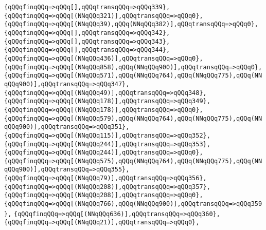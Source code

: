 \verb|{qQQqfinqQQq=>qQQq[],qQQqtransqQQq=>qQQq339},|\newline
\verb|{qQQqfinqQQq=>qQQq[(NNqQQq321)],qQQqtransqQQq=>qQQq0},|\newline
\verb|{qQQqfinqQQq=>qQQq[(NNqQQq39),qQQq(NNqQQq382)],qQQqtransqQQq=>qQQq0},|\newline
\verb|{qQQqfinqQQq=>qQQq[],qQQqtransqQQq=>qQQq342},|\newline
\verb|{qQQqfinqQQq=>qQQq[],qQQqtransqQQq=>qQQq343},|\newline
\verb|{qQQqfinqQQq=>qQQq[],qQQqtransqQQq=>qQQq344},|\newline
\verb|{qQQqfinqQQq=>qQQq[(NNqQQq436)],qQQqtransqQQq=>qQQq0},|\newline
\verb|{qQQqfinqQQq=>qQQq[(NNqQQq858),qQQq(NNqQQq900)],qQQqtransqQQq=>qQQq0},|\newline
\verb|{qQQqfinqQQq=>qQQq[(NNqQQq571),qQQq(NNqQQq764),qQQq(NNqQQq775),qQQq(NNqQQq900)],qQQqtransqQQq=>qQQq347},|\newline
\verb|{qQQqfinqQQq=>qQQq[(NNqQQq49)],qQQqtransqQQq=>qQQq348},|\newline
\verb|{qQQqfinqQQq=>qQQq[(NNqQQq178)],qQQqtransqQQq=>qQQq349},|\newline
\verb|{qQQqfinqQQq=>qQQq[(NNqQQq178)],qQQqtransqQQq=>qQQq0},|\newline
\verb|{qQQqfinqQQq=>qQQq[(NNqQQq579),qQQq(NNqQQq764),qQQq(NNqQQq775),qQQq(NNqQQq900)],qQQqtransqQQq=>qQQq351},|\newline
\verb|{qQQqfinqQQq=>qQQq[(NNqQQq115)],qQQqtransqQQq=>qQQq352},|\newline
\verb|{qQQqfinqQQq=>qQQq[(NNqQQq244)],qQQqtransqQQq=>qQQq353},|\newline
\verb|{qQQqfinqQQq=>qQQq[(NNqQQq244)],qQQqtransqQQq=>qQQq0},|\newline
\verb|{qQQqfinqQQq=>qQQq[(NNqQQq575),qQQq(NNqQQq764),qQQq(NNqQQq775),qQQq(NNqQQq900)],qQQqtransqQQq=>qQQq355},|\newline
\verb|{qQQqfinqQQq=>qQQq[(NNqQQq79)],qQQqtransqQQq=>qQQq356},|\newline
\verb|{qQQqfinqQQq=>qQQq[(NNqQQq208)],qQQqtransqQQq=>qQQq357},|\newline
\verb|{qQQqfinqQQq=>qQQq[(NNqQQq208)],qQQqtransqQQq=>qQQq0},|\newline
\verb|{qQQqfinqQQq=>qQQq[(NNqQQq766),qQQq(NNqQQq900)],qQQqtransqQQq=>qQQq359},|\newline
\verb|{qQQqfinqQQq=>qQQq[(NNqQQq636)],qQQqtransqQQq=>qQQq360},|\newline
\verb|{qQQqfinqQQq=>qQQq[(NNqQQq21)],qQQqtransqQQq=>qQQq0},|\newline
